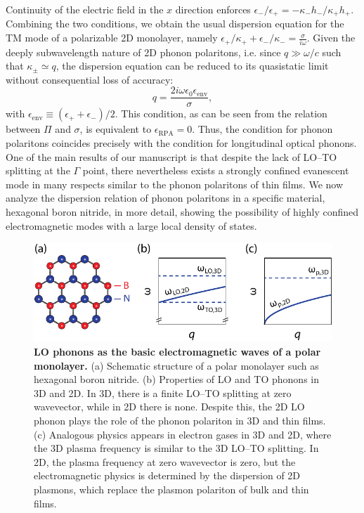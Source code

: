 \documentclass[aps,prb,twocolumn,
	           groupedaddress,superscriptaddress,
               amsfonts,amssymb,amsmath,floatfix,
	           citeautoscript]{revtex4-1}
\makeatletter
\newcommand{\ie}{i.e.\@\xspace} %
\makeatother
\begin{document}
Continuity of the electric field in the $x$ direction enforces ${\epsilon_-}/{\epsilon_+} = -{\kappa_-h_-}/{\kappa_+h_+}$. 
Combining the two conditions, we obtain the usual dispersion equation for the TM mode of a polarizable 2D monolayer, namely $\epsilon_+/\kappa_+ + \epsilon_-/\kappa_- = \frac{\sigma}{i\omega}$. Given the deeply subwavelength nature of 2D phonon polaritons, \ie since $q\gg\omega/c$ such that $\kappa_{\pm}\simeq q$, the dispersion equation can be reduced to its quasistatic limit without consequential loss of accuracy:
\begin{equation}
 q=\frac{2i\omega\epsilon_0\epsilon_{\mathrm{env}}}{\sigma},
    \label{eq:dispeq}
\end{equation}
with $\epsilon_{\mathrm{env}}\equiv (\epsilon_++\epsilon_-)/2$. This condition, as can be seen from the relation between $\Pi$ and $\sigma$, is equivalent to $\epsilon_{\mathrm{RPA}}=0$. Thus, the condition for phonon polaritons coincides precisely with the condition for longitudinal optical phonons.  One of the main results of our manuscript is that despite the lack of LO--TO splitting at the $\Gamma$ point, there nevertheless exists a strongly confined evanescent mode in many respects similar to the phonon polaritons of thin films. We now analyze the dispersion relation of phonon polaritons in a specific material, hexagonal boron nitride, in more detail, showing the possibility of highly confined electromagnetic modes with a large local density of states. 

\begin{figure}[t]
    \includegraphics[width=0.95\linewidth]{fig1.pdf}
    \caption{%
        \textbf{LO phonons as the basic electromagnetic waves of a polar monolayer.} (a) Schematic structure of a polar monolayer such as hexagonal boron nitride. (b) Properties of LO and TO phonons in 3D and 2D. In 3D, there is a finite LO--TO splitting at zero wavevector, while in 2D there is none. Despite this, the 2D LO phonon plays the role of the phonon polariton in 3D and thin films. (c) Analogous physics appears in electron gases in 3D and 2D, where the 3D plasma frequency is similar to the 3D LO--TO splitting. In 2D, the plasma frequency at zero wavevector is zero, but the electromagnetic physics is determined by the dispersion of 2D plasmons, which replace the plasmon polariton of bulk and thin films.
        \label{fig:1}
        }
\end{figure}~
\end{document}
